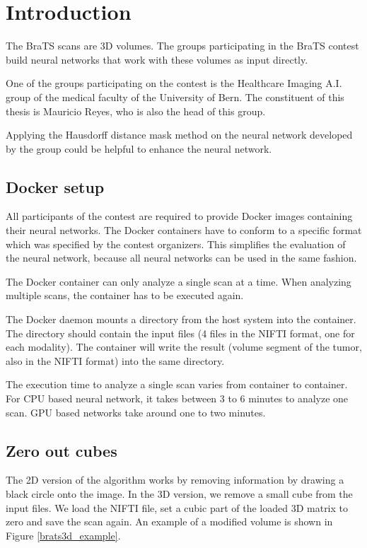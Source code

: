 \section{Introduction}
The BraTS scans are 3D volumes. The groups participating in the BraTS contest build neural networks that work with these volumes as input directly.

One of the groups participating on the contest is the Healthcare Imaging A.I. group of the medical faculty of the University of Bern. The constituent of this thesis
is Mauricio Reyes, who is also the head of this group.

Applying the Hausdorff distance mask method on the neural network developed by the group could be helpful to enhance the neural network.

\subsection{Docker setup}

All participants of the contest are required to provide Docker images containing their neural networks. The Docker containers have to conform to a specific format which
was specified by the contest organizers. This simplifies the evaluation of the neural network, because all neural networks can be used in the same fashion.

The Docker container can only analyze a single scan at a time. When analyzing multiple scans, the container has to be executed again.

The Docker daemon mounts a directory from the host system into the container. The directory should contain the input files (4 files in the NIFTI format, one for each modality). The container will write the result (volume segment of the tumor, also in the NIFTI format) into the same directory.

The execution time to analyze a single scan varies from container to container. For CPU based neural network, it takes between 3 to 6 minutes to analyze one scan. GPU based networks take around one to two minutes.

\subsection{Zero out cubes}
The 2D version of the algorithm works by removing information by drawing a black circle onto the image. In the 3D version, we remove a small cube from the input files.
We load the NIFTI file, set a cubic part of the loaded 3D matrix to zero and save the scan again. An example of a modified volume is shown in Figure \ref{brats3d_example}.

